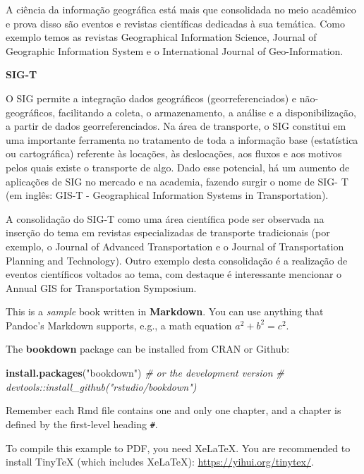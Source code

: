 \documentclass[
]{book}
\newenvironment{Shaded}{\begin{snugshade}}{\end{snugshade}}
\newcommand{\CommentTok}[1]{\textcolor[rgb]{0.56,0.35,0.01}{\textit{#1}}}
\newcommand{\KeywordTok}[1]{\textcolor[rgb]{0.13,0.29,0.53}{\textbf{#1}}}
\newcommand{\NormalTok}[1]{#1}
\newcommand{\StringTok}[1]{\textcolor[rgb]{0.31,0.60,0.02}{#1}}
\begin{document}
A ciência da informação geográfica está mais que consolidada no meio acadêmico e prova disso são eventos e revistas científicas dedicadas à sua temática. Como exemplo temos as revistas Geographical Information Science, Journal of Geographic Information System e o International Journal of Geo-Information.

\textbf{SIG-T}

O SIG permite a integração dados geográficos (georreferenciados) e não-geográficos, facilitando a coleta, o armazenamento, a análise e a disponibilização, a partir de dados georreferenciados. Na área de transporte, o SIG constitui em uma importante ferramenta no tratamento de toda a informação base (estatística ou cartográfica) referente às locações, às deslocações, aos fluxos e aos motivos pelos quais existe o transporte de algo. Dado esse potencial, há um aumento de aplicações de SIG no mercado e na academia, fazendo surgir o nome de SIG- T (em inglês: GIS-T - Geographical Information Systems in Transportation).

A consolidação do SIG-T como uma área científica pode ser observada na inserção do tema em revistas especializadas de transporte tradicionais (por exemplo, o Journal of Advanced Transportation e o Journal of Transportation Planning and Technology). Outro exemplo desta consolidação é a realização de eventos científicos voltados ao tema, com destaque é interessante mencionar o Annual GIS for Transportation Symposium.

This is a \emph{sample} book written in \textbf{Markdown}. You can use anything that Pandoc's Markdown supports, e.g., a math equation \(a^2 + b^2 = c^2\).

The \textbf{bookdown} package can be installed from CRAN or Github:

\begin{Shaded}
\begin{Highlighting}[]
\KeywordTok{install.packages}\NormalTok{(}\StringTok{"bookdown"}\NormalTok{)}
\CommentTok{# or the development version}
\CommentTok{# devtools::install_github("rstudio/bookdown")}
\end{Highlighting}
\end{Shaded}

Remember each Rmd file contains one and only one chapter, and a chapter is defined by the first-level heading \texttt{\#}.

To compile this example to PDF, you need XeLaTeX. You are recommended to install TinyTeX (which includes XeLaTeX): \url{https://yihui.org/tinytex/}.
\end{document}
